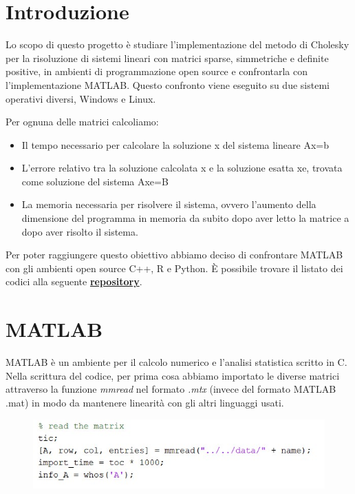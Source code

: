 \documentclass[a4paper,12pt]{article}
\begin{document}
\tableofcontents

\newpage

\section{Introduzione}
Lo scopo di questo progetto è studiare l’implementazione del metodo di Cholesky per la risoluzione di sistemi lineari con matrici sparse, simmetriche e deﬁnite positive, in ambienti di programmazione open source e confrontarla con l’implementazione MATLAB. Questo confronto viene eseguito su due sistemi operativi diversi, Windows e Linux. 
\bigskip

\noindent Per ognuna delle matrici calcoliamo:
\begin{itemize}
\item Il tempo necessario per calcolare la soluzione x del sistema lineare Ax=b
\item L’errore relativo tra la soluzione calcolata x e la soluzione esatta xe, trovata come soluzione del sistema Axe=B
\item La memoria necessaria per risolvere il sistema, ovvero l’aumento della dimensione del programma in memoria da subito dopo aver letto la matrice a dopo aver risolto il sistema.
\end{itemize} 
\bigskip

\noindent Per poter raggiungere questo obiettivo abbiamo deciso di confrontare MATLAB con gli ambienti open source C++, R e Python.
È possibile trovare il listato dei codici alla seguente \href{https://gitlab.com/okamiRvS/cholesky-computing}{\textbf{repository}}.


\newpage

\section{MATLAB}

MATLAB è un ambiente per il calcolo numerico e l’analisi statistica scritto in C. 
Nella scrittura del codice, per prima cosa abbiamo importato le diverse matrici attraverso la funzione \textit{mmread} nel formato \textit{.mtx}  (invece del formato MATLAB .mat) in modo da mantenere linearità con gli altri linguaggi usati.
\bigskip

\begin{figure}[H]
\centering
\includegraphics[width=0.6\linewidth]{img/matlab1.jpg}
\label{fig:1}
\end{figure}
\end{document}
